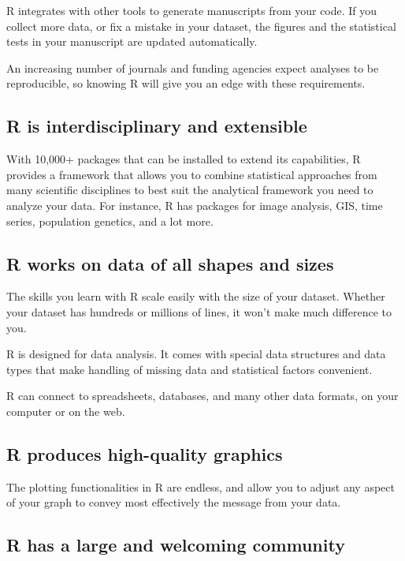 \documentclass[]{book}
\begin{document}
R integrates with other tools to generate manuscripts from your code. If
you collect more data, or fix a mistake in your dataset, the figures and
the statistical tests in your manuscript are updated automatically.

An increasing number of journals and funding agencies expect analyses to
be reproducible, so knowing R will give you an edge with these
requirements.

\subsection{R is interdisciplinary and
extensible}\label{r-is-interdisciplinary-and-extensible}

With 10,000+ packages that can be installed to extend its capabilities,
R provides a framework that allows you to combine statistical approaches
from many scientific disciplines to best suit the analytical framework
you need to analyze your data. For instance, R has packages for image
analysis, GIS, time series, population genetics, and a lot more.

\subsection{R works on data of all shapes and
sizes}\label{r-works-on-data-of-all-shapes-and-sizes}

The skills you learn with R scale easily with the size of your dataset.
Whether your dataset has hundreds or millions of lines, it won't make
much difference to you.

R is designed for data analysis. It comes with special data structures
and data types that make handling of missing data and statistical
factors convenient.

R can connect to spreadsheets, databases, and many other data formats,
on your computer or on the web.

\subsection{R produces high-quality
graphics}\label{r-produces-high-quality-graphics}

The plotting functionalities in R are endless, and allow you to adjust
any aspect of your graph to convey most effectively the message from
your data.

\subsection{R has a large and welcoming
community}\label{r-has-a-large-and-welcoming-community}
\end{document}
